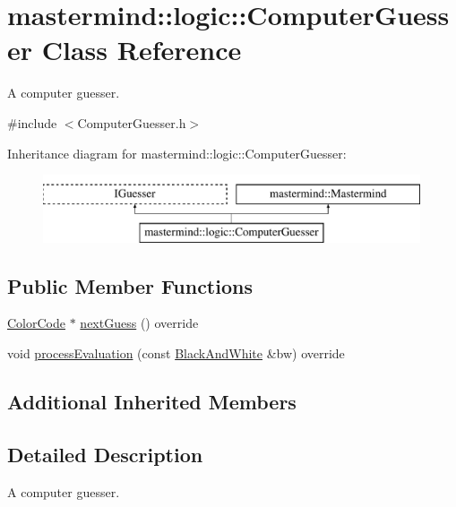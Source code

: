 \hypertarget{classmastermind_1_1logic_1_1_computer_guesser}{}\section{mastermind\+:\+:logic\+:\+:Computer\+Guesser Class Reference}
\label{classmastermind_1_1logic_1_1_computer_guesser}


A computer guesser.  




{\ttfamily \#include $<$Computer\+Guesser.\+h$>$}

Inheritance diagram for mastermind\+:\+:logic\+:\+:Computer\+Guesser\+:\begin{figure}[H]
\begin{center}
\leavevmode
\includegraphics[height=2.000000cm]{classmastermind_1_1logic_1_1_computer_guesser}
\end{center}
\end{figure}
\subsection*{Public Member Functions}
\begin{DoxyCompactItemize}
\item 
\hyperlink{classmastermind_1_1logic_1_1_color_code}{Color\+Code} $\ast$ \hyperlink{classmastermind_1_1logic_1_1_computer_guesser_a5553cb2d63534927fbf9031c5d40c828}{next\+Guess} () override
\item 
void \hyperlink{classmastermind_1_1logic_1_1_computer_guesser_a728f55a5700d3574fc6b9207c9e8db7d}{process\+Evaluation} (const \hyperlink{classmastermind_1_1logic_1_1_black_and_white}{Black\+And\+White} \&bw) override
\end{DoxyCompactItemize}
\subsection*{Additional Inherited Members}


\subsection{Detailed Description}
A computer guesser. 


